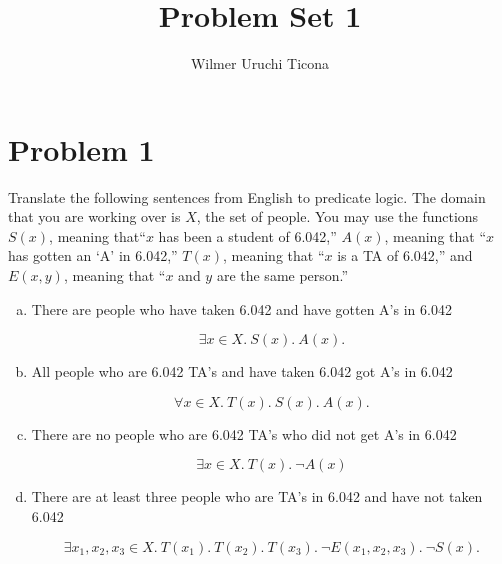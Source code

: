 \documentclass[11pt, oneside]{article}   	%
\title{Problem Set 1}
\author{Wilmer Uruchi Ticona}
\begin{document}
\maketitle

\section{Problem 1}
Translate the following sentences from English to predicate logic. The domain that you are working over is $X$, the set of people. You may use the functions $S(x)$, meaning that``$x$ has been a student of 6.042,” $A(x)$, meaning that ``$x$ has gotten an ‘A’ in 6.042,” $T(x)$, meaning that ``$x$ is a TA of 6.042,” and $E(x,y)$, meaning that ``$x$ and $y$ are the same person.”

\begin{enumerate}[a)]
\item There are people who have taken 6.042 and have gotten A’s in 6.042

$$\exists x \in X. \ S(x). \ A(x).$$

\item All people who are 6.042 TA’s and have taken 6.042 got A’s in 6.042

$$\forall x \in X. \ T(x). \ S(x). \ A(x).$$

\item There are no people who are 6.042 TA’s who did not get A’s in 6.042

$$\exists x \in X. \ T(x). \ \neg A(x)$$

\item There are at least three people who are TA’s in 6.042 and have not taken 6.042

$$\exists x_1,x_2,x_3 \in X. \ T(x_1). \ T(x_2). \ T(x_3). \ \neg E(x_1,x_2,x_3). \ \neg S(x).  $$
\end{enumerate}
\end{document}

